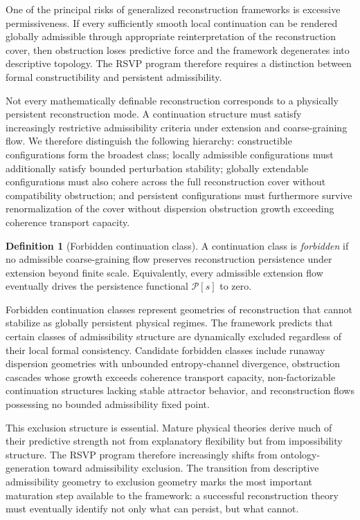 \documentclass[11pt, a4paper]{article}
\theoremstyle{plain}
\theoremstyle{definition}
\newtheorem{definition}[theorem]{Definition}
\theoremstyle{remark}
\begin{document}
One of the principal risks of generalized reconstruction frameworks is excessive
permissiveness. If every sufficiently smooth local continuation can be rendered
globally admissible through appropriate reinterpretation of the reconstruction cover,
then obstruction loses predictive force and the framework degenerates into descriptive
topology. The RSVP program therefore requires a distinction between formal
constructibility and persistent admissibility.

Not every mathematically definable reconstruction corresponds to a physically
persistent reconstruction mode. A continuation structure must satisfy increasingly
restrictive admissibility criteria under extension and coarse-graining flow. We
therefore distinguish the following hierarchy: constructible configurations form the
broadest class; locally admissible configurations must additionally satisfy bounded
perturbation stability; globally extendable configurations must also cohere across the
full reconstruction cover without compatibility obstruction; and persistent
configurations must furthermore survive renormalization of the cover without
dispersion obstruction growth exceeding coherence transport capacity.

\begin{definition}[Forbidden continuation class]
A continuation class is \emph{forbidden} if no admissible coarse-graining flow
preserves reconstruction persistence under extension beyond finite scale.
Equivalently, every admissible extension flow eventually drives the persistence
functional $\mathcal{P}[s]$ to zero.
\end{definition}

Forbidden continuation classes represent geometries of reconstruction that cannot
stabilize as globally persistent physical regimes. The framework predicts that certain
classes of admissibility structure are dynamically excluded regardless of their local
formal consistency. Candidate forbidden classes include runaway dispersion geometries
with unbounded entropy-channel divergence, obstruction cascades whose growth exceeds
coherence transport capacity, non-factorizable continuation structures lacking stable
attractor behavior, and reconstruction flows possessing no bounded admissibility fixed
point.

This exclusion structure is essential. Mature physical theories derive much of their
predictive strength not from explanatory flexibility but from impossibility structure.
The RSVP program therefore increasingly shifts from ontology-generation toward
admissibility exclusion. The transition from descriptive admissibility geometry to
exclusion geometry marks the most important maturation step available to the
framework: a successful reconstruction theory must eventually identify not only what
can persist, but what cannot.
\end{document}
